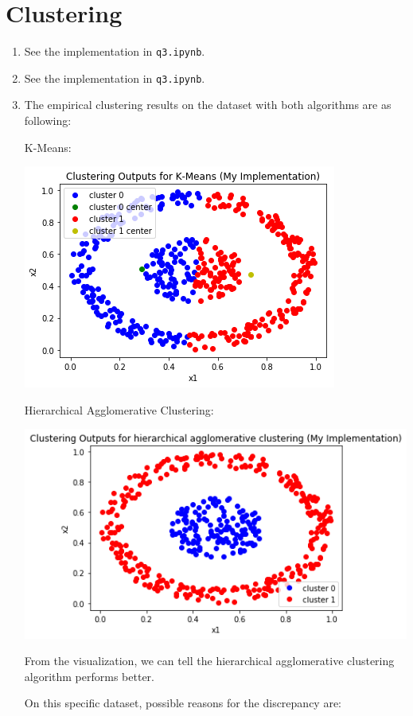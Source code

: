 \documentclass[paper=letter, fontsize=12pt]{article}
\begin{document}
\section{Clustering}
\begin{enumerate}[label=(\alph*)]
	\item See the implementation in \verb|q3.ipynb|.
	
	\item See the implementation in \verb|q3.ipynb|.
	
	\item The empirical clustering results on the dataset with both algorithms are as following:
	
	K-Means:
	
	\includegraphics[scale=0.6]{q3c1.png}
	
	Hierarchical Agglomerative Clustering:
	
	\includegraphics[scale=0.6]{q3c2.png}
	
	From the visualization, we can tell the hierarchical agglomerative clustering algorithm performs better. 
	
	On this specific dataset, possible reasons for the discrepancy are:
	

\end{enumerate}
\end{document}

